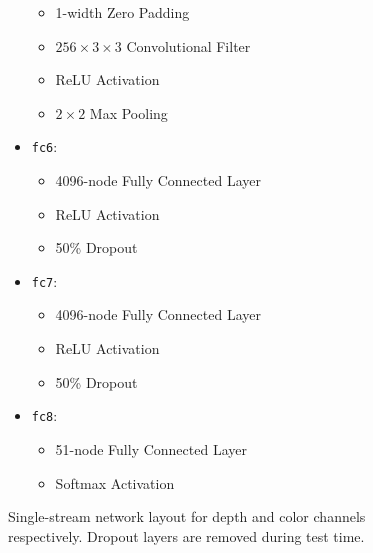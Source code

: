 \begin{figure}
\begin{mdframed}
\begin{itemize}
\begin{itemize}
        \item 1-width Zero Padding
        \item $256 \times 3 \times 3$ Convolutional Filter
        \item ReLU Activation
        \item $2 \times 2$ Max Pooling
    \end{itemize}
    \item \texttt{fc6}:
    \begin{itemize}
        \item 4096-node Fully Connected Layer
        \item ReLU Activation
        \item 50\% Dropout
    \end{itemize}
    \item \texttt{fc7}:
    \begin{itemize}
        \item 4096-node Fully Connected Layer
        \item ReLU Activation
        \item 50\% Dropout
    \end{itemize}
    \item \texttt{fc8}:
    \begin{itemize}
        \item 51-node Fully Connected Layer
        \item Softmax Activation
    \end{itemize}
\end{itemize}
\end{mdframed}
\caption{Single-stream network layout for depth and color channels respectively. Dropout layers are removed during test time.}
\label{fig:single_stream_layout}
\end{figure}

